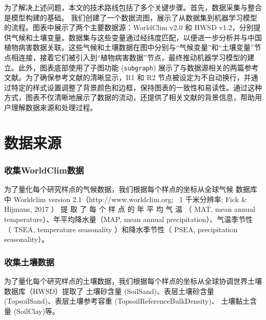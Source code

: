\documentclass[AutoFakeBold]{LZUThesis-PgD&PhD}
\begin{document}
	
		为了解决上述问题，本文的技术路线包括了多个关键步骤。首先，数据采集与整合是模型构建的基础。
		我们创建了一个数据流图，展示了从数据集到机器学习模型的流程。图表中展示了两个主要数据源：WorldClim v2.0 和 HWSD v1.2，分别提供气候和土壤变量。数据集与这些变量通过经纬度匹配，以便进一步分析并与中国植物病害数据关联。这些气候和土壤数据在图中分别与“气候变量”和“土壤变量”节点相连接，接着它们被引入到“植物病害数据”节点，最终推动机器学习模型的建立。此外，图表底部使用了子图功能 (\texttt{subgraph}) 展示了与数据源相关的两篇参考文献。为了确保参考文献的清晰显示，R1 和 R2 节点被设定为不自动换行，并通过特定的样式设置调整了背景颜色和边框，保持图表的一致性和易读性。通过这种方式，图表不仅清晰地展示了数据的流动，还提供了相关文献的背景信息，帮助用户理解数据来源和处理过程。
		
		
		
%			
%			
%			
	\chapter{数据来源}
		\subsection{收集WorldClim数据}
	
	为了量化每个研究样点的气候数据，我们根据每个样点的坐标从全球气候
	数据库中 Worldclim version 2.1（http://www.worldclim.org; ~1 千米分辨率; Fick 
	\& Hijmans, 2017 ） 提 取 了 每 个 样 点 的 年 平 均 气 温 （ MAT, mean annual 
	temperature）、年平均降水量（MAP, mean annual precipitation）、气温季节性
	（ TSEA, temperature seasonality ）和降水季节性（ PSEA, precipitation 
	seasonality）。
	
	\subsection{收集土壤数据}
	为了量化每个研究样点的土壤数据，我们根据每个样点的坐标从全球协调世界土壤数据库（HWSD）提取了
	土壤砂含量 (SoilSand)、表层土壤砂含量 (TopsoilSand)、表层土壤参考容重 (TopsoilReferenceBulkDensity)、
	土壤黏土含量 (SoilClay)等。
	
\end{document}
